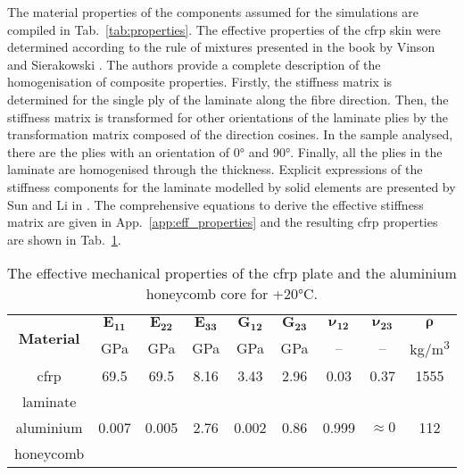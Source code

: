 The material properties of the components assumed for the simulations are compiled in Tab.~\ref{tab:properties}.
The effective properties of the \ac{cfrp} skin were determined according to the rule of mixtures presented in the book by Vinson and Sierakowski \cite{vinson1993behavior}.
The authors provide a complete description of the homogenisation of composite properties.
Firstly, the stiffness matrix is determined for the single ply of the laminate along the fibre direction.
Then, the stiffness matrix is transformed for other orientations of the laminate plies by the transformation matrix composed of the direction cosines.
In the sample analysed, there are the plies with an orientation of \ang{0} and \ang{90}.
Finally, all the plies in the laminate are homogenised through the thickness.
Explicit expressions of the stiffness components for the laminate modelled by solid elements are presented by Sun and Li in \cite{sun1988three}.
The comprehensive equations to derive the effective stiffness matrix are given in App.~\ref{app:eff_properties} and the resulting \ac{cfrp} properties are shown in Tab.~\ref{tab:properties_eff}.
\begin{table}[H]
	\centering
	\small
	\tabcolsep=0.25cm
	\caption{\label{tab:properties_eff} The effective mechanical properties of the \ac{cfrp} plate and the aluminium honeycomb core for +20\unit{\degreeCelsius}.}
	\begin{tabular}{ccccccccc}
		\toprule
		\multirow{2}{*}{\textbf{Material}} & \(\boldsymbol{E_{11}}\) & \(\boldsymbol{E_{22}}\) & \(\boldsymbol{E_{33}}\) & \(\boldsymbol{G_{12}}\) & \(\boldsymbol{G_{23}}\) & \(\boldsymbol{\nu_{12}}\)	& \(\boldsymbol{\nu_{23}}\) & \(\boldsymbol{\rho}\) \\
		& \unit{\giga\pascal} & \unit{\giga\pascal} & \unit{\giga\pascal} & \unit{\giga\pascal} & \unit{\giga\pascal} & -- & -- & \unit[per-mode = symbol]
		{\kilogram\per\cubic\metre}\\
		\midrule
		\ac{cfrp} & 69.5 & 69.5 & 8.16 & 3.43 & 2.96 & 0.03 & 0.37 & 1555\\
		laminate & & & & & & & &\\
		\midrule
		aluminium & 0.007 & 0.005 & 2.76 & 0.002 & 0.86 & 0.999 & \(\approx0\) & 112\\
		honeycomb & & & & & & & &\\
		\bottomrule
	\end{tabular}
\end{table}